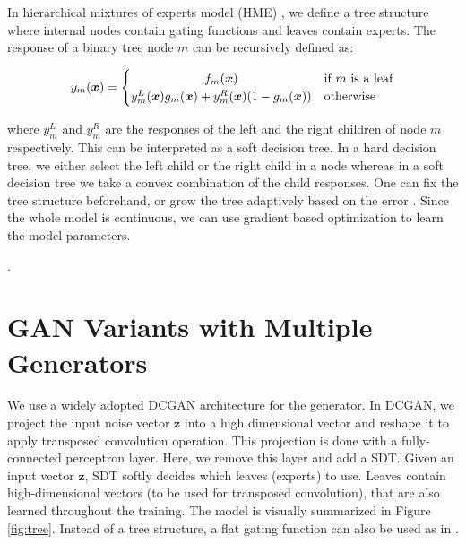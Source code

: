 \documentclass[a4paper,onesided,12pt]{report}
\begin{document}
In hierarchical mixtures of experts model (HME) \cite{hme}, we define a tree structure where internal nodes contain gating functions and leaves contain experts. The response of a binary tree node $m$ can be recursively defined as:

\begin{equation}
y_m(\boldsymbol{x})=
	\begin{cases}
		\hfil f_m(\boldsymbol{x}) &\text{if $m$ is a leaf} \\
		\hfil y_m^{L}(\boldsymbol{x})g_m(\boldsymbol{x}) + y_m^{R}(\boldsymbol{x})(1 - g_m(\boldsymbol{x})) &\text{otherwise}
	\end{cases}
\end{equation}

where $y_m^L$ and $y_m^R$ are the responses of the left and the right children of node $m$ respectively. This can be interpreted as a soft decision tree. In a hard decision tree, we either select the left child or the right child in a node whereas in a soft decision tree we take a convex combination of the child responses. One can fix the tree structure beforehand, or grow the tree adaptively based on the error \cite{sdt, budding}. Since the whole model is continuous, we can use gradient based optimization to learn the model parameters.

\lipsum[5]

.\section{GAN Variants with Multiple Generators}
\label{sec:related}

We use a widely adopted DCGAN \cite{dcgan} architecture for the generator. In DCGAN, we project the input noise vector $\boldsymbol{z}$ into a high dimensional vector and reshape it to apply transposed convolution operation. This projection is done with a fully-connected perceptron layer. Here, we remove this layer and add a SDT. Given an input vector $\boldsymbol{z}$, SDT softly decides which leaves (experts) to use. Leaves contain high-dimensional vectors (to be used for transposed convolution), that are also learned throughout the training. The model is visually summarized in Figure \ref{fig:tree}. Instead of a tree structure, a flat gating function can also be used as in \cite{me}.
\end{document}
